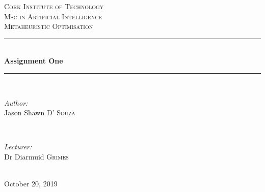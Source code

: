 \documentclass[13pt]{report}
\begin{document}
\begin{titlepage}

\newcommand{\HRule}{\rule{\linewidth}{0.5mm}} %

\center %
 
\textsc{\LARGE Cork Institute of Technology}\\[1.5cm] %
\textsc{\Large Msc in Artificial Intelligence}\\[0.5cm] %
\textsc{\large Metaheuristic Optimisation }\\[0.5cm] %


\HRule \\[0.4cm]
{ \huge \bfseries Assignment One}\\[0.4cm] 
\HRule \\[1.5cm]
 


\begin{minipage}{0.4\textwidth}
\begin{flushleft} \large
\emph{Author:}\\
Jason Shawn \textsc{D' Souza} 
\end{flushleft}
\end{minipage}
~
\begin{minipage}{0.4\textwidth}
\begin{flushright} \large
\emph{Lecturer:} \\
Dr Diarmuid  \textsc{Grimes} 
\end{flushright}
\end{minipage}\\[2cm]




{\large October 20, 2019}\\[2cm] %




\end{titlepage}
\end{document}
